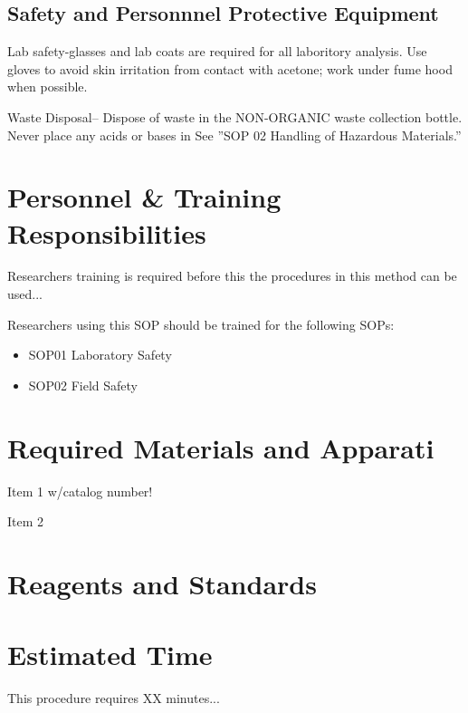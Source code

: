 \documentclass[12pt]{../SOP3_beta}
\begin{document}
\subsection{Safety and Personnnel Protective Equipment}

\NP Lab safety-glasses and lab coats are required for all laboritory analysis. Use gloves to avoid skin irritation from contact with acetone; work under fume hood when possible. 

\NP Waste Disposal-- Dispose of waste in the NON-ORGANIC waste collection bottle. Never place any acids or bases in See ''SOP 02 Handling of Hazardous Materials.'' %

\section{Personnel \& Training Responsibilities}

\NP Researchers training is required before this the procedures in this method can be used... 

\NP Researchers using this SOP should be trained for the following SOPs:

\begin{itemize}
  \item SOP01 Laboratory Safety
  \item SOP02 Field Safety
\end{itemize}

\section{Required Materials and Apparati}

\NP Item 1 w/catalog number!

\NP Item 2

\section{Reagents and Standards}

\section{Estimated Time}

\NP This procedure requires XX minutes...
\end{document}
